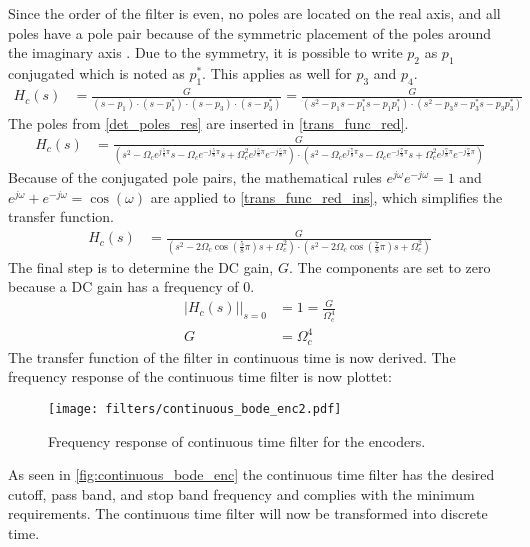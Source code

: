 Since the order of the filter is even, no poles are located on the real axis, and all poles have a pole pair because of the symmetric placement of the poles around the imaginary axis \citep[p. 1041]{oppenheim}. Due to the symmetry, it is possible to write $p_2$ as $p_1$ conjugated which is noted as $p_1^*$. This applies as well for $p_3$ and $p_4$.
\begin{align}
H_c(s) 	&= \frac{G}{(s-p_1) \cdot (s-p_1^*) \cdot (s-p_3) \cdot (s-p_3^*)} = \frac{G}{(s^2-p_1 s - p_1^*s - p_1 p_1^*) \cdot (s^2-p_3 s - p_3^* s - p_3 p_3^*)}
\label{trans_func_red}
\end{align}
The poles from \autoref{det_poles_res} are inserted in \autoref{trans_func_red}. 
\begin{align}
H_c(s) 	&= \frac{G}{(s^2-\Omega_c e^{j \frac{5}{8} \pi}s - \Omega_c e^{-j \frac{5}{8} \pi}s + \Omega_c^2 e^{j \frac{5}{8} \pi} e^{-j \frac{5}{8} \pi}) \cdot (s^2-\Omega_c e^{j \frac{7}{8} \pi}s - \Omega_c e^{-j \frac{7}{8} \pi}s + \Omega_c^2 e^{j \frac{7}{8} \pi} e^{-j \frac{7}{8} \pi})}
\label{trans_func_red_ins}
\end{align}
Because of the conjugated pole pairs, the mathematical rules $e^{j\omega}e^{-j\omega} = 1$ and $e^{j\omega}+e^{-j\omega} = \cos (\omega)$ are applied to \autoref{trans_func_red_ins}, which simplifies the transfer function.
\begin{align}
H_c(s) &= \frac{G}{(s^2 - 2\Omega_c \cos (\frac{5}{8} \pi)s + \Omega_c^2) \cdot (s^2 - 2\Omega_c \cos (\frac{7}{8} \pi)s + \Omega_c^2)}
\label{trans_func_red_ins2}
\end{align}
The final step is to determine the DC gain, $G$. The components are set to zero because a DC gain has a frequency of 0.
\begin{align}
|H_c(s)|\bigg|_{s=0} 	&= 1 =\frac{G}{\Omega_c^4}\\ 
G &= \Omega_c^4
\label{trans_func_red_ins3}
\end{align}
The transfer function of the filter in continuous time is now derived. The frequency response of the continuous time filter is now plottet:
\begin{figure}[H]
    \centering
    \texttt{[image: filters/continuous\_bode\_enc2.pdf]}
    \caption{Frequency response of continuous time filter for the encoders.}
    \label{fig:continuous_bode_enc}
\end{figure}
As seen in \autoref{fig:continuous_bode_enc} the continuous time filter has the desired cutoff, pass band, and stop band frequency and complies with the minimum requirements. The continuous time filter will now be transformed into discrete time.

